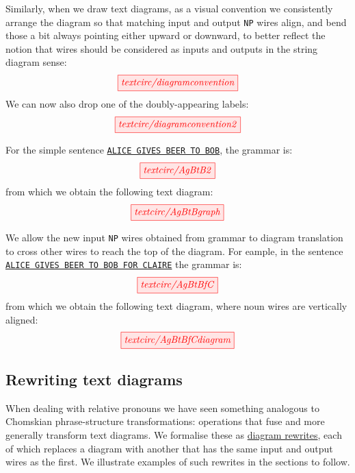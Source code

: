Similarly, when we draw text diagrams, as a visual convention  we consistently arrange the diagram so that matching input and output \texttt{NP} wires align, and bend those a bit always pointing either upward or downward, to better reflect the notion that wires should be considered as inputs and outputs in the string diagram sense: 
\[
\tikzfig{textcirc/diagramconvention}
\]
We can now also drop one of the doubly-appearing labels:
\[
\tikzfig{textcirc/diagramconvention2}
\]

\begin{example} 
For the simple sentence \texttt{\underline{ALICE GIVES BEER TO BOB}}, the grammar is:
\[
\tikzfig{textcirc/AgBtB2}
\]
from which we obtain the following text diagram:
\[
\tikzfig{textcirc/AgBtBgraph}
\]
\end{example}

\begin{example}
We allow the new input \texttt{NP} wires obtained from grammar to diagram translation to cross other wires to reach the top of the diagram. For eample, in the sentence \texttt{\underline{ALICE GIVES BEER TO BOB FOR CLAIRE}} the grammar is:
\[\tikzfig{textcirc/AgBtBfC}\]
from which we obtain the following text diagram, where noun wires are vertically aligned:
\[\tikzfig{textcirc/AgBtBfCdiagram}\]
\end{example}


\subsection{Rewriting text diagrams}

When dealing with relative pronouns we have seen something analogous to Chomskian phrase-structure transformations: operations that fuse and more generally transform text  diagrams. We formalise these as \underline{diagram rewrites}, each of which replaces a diagram with another that has the same input and output wires as the first. We illustrate examples of such rewrites in the sections to follow.

